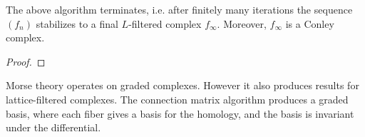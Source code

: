 \begin{thm}
The above algorithm terminates, i.e. after finitely many iterations the sequence $(f_n)$ stabilizes to a final $L$-filtered complex $f_\infty$.  Moreover, $f_\infty$ is a Conley complex.
\end{thm}
\begin{proof}

\end{proof}

\begin{rem}
Morse theory operates on graded complexes.  However it also produces results for lattice-filtered complexes.  The connection matrix algorithm produces a graded basis, where each fiber gives a basis for the homology, and the basis is invariant under the differential.
\end{rem}





